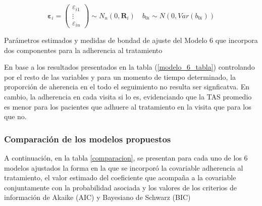 \documentclass[spanish]{article}
\numberwithin{figure}{subsection}
\numberwithin{equation}{subsection}
\numberwithin{table}{subsection}
\begin{document}
\[ 
	\bm{\varepsilon}_i = \begin{pmatrix} \varepsilon_{i1} \\ \vdots \\ \varepsilon_{in} \end{pmatrix} \sim N_{n}(0, \bm{R}_i)
	\quad
	b_{0i} \sim N(0, Var(b_{0i}))
\]

\begin{table}[H]
	\centering
	\caption{Parámetros estimados y medidas de bondad de ajuste del Modelo 6 que incorpora dos componentes para la adherencia al tratamiento}
	\label{modelo_6_tabla}
	
\end{table}

En base a los resultados presentados en la tabla (\ref{modelo_6_tabla})
controlando por el resto de las variables y para un momento de tiempo
determinado, la proporción de aherencia en el todo el seguimiento no resulta ser
signficatva. En cambio, la adherencia en cada visita si lo es, evidenciando que
la TAS promedio es menor para los pacientes que adhuere al tratamiento en la
visita que para los que no.

\subsubsection{Comparación de los modelos propuestos}

A continuación, en la tabla \ref{comparacion}, se presentan para cada uno de los
6 modelos ajustados la forma en la que se incorporó la covariable adherencia al
tratamiento, el valor estimado del coeficiente que acompaña a la covariable
conjuntamente con la probabilidad asociada y los valores de los criterios de
información de Akaike (AIC) y Bayesiano de Schwarz (BIC)
\end{document}
